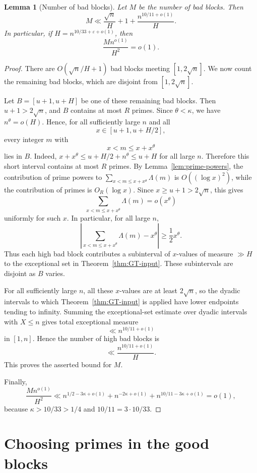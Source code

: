\documentclass[11pt,reqno]{amsart}
\numberwithin{equation}{section}
\theoremstyle{plain}
\newtheorem{lemma}[theorem]{Lemma}
\theoremstyle{definition}
\newcommand{\eps}{\varepsilon}
\begin{document}
\begin{lemma}[Number of bad blocks]
\label{lem:bad-blocks}
Let $M$ be the number of bad blocks.  Then
\[
M \ll \frac{\sqrt n}{H}+1+\frac{n^{10/11+o(1)}}{H}.
\]
In particular, if $H=n^{10/33+\eps+o(1)}$, then
\[
        \frac{M n^{o(1)}}{H^2}=o(1).
\]
\end{lemma}

\begin{proof}
There are $O(\sqrt n/H+1)$ bad blocks meeting $[1,2\sqrt n]$.  We now count the
remaining bad blocks, which are disjoint from $[1,2\sqrt n]$.

Let \(B=[u+1,u+H]\) be one of these remaining bad blocks.  Then
\(u+1>2\sqrt n\), and \(B\) contains at most \(R\) primes.  Since
\(\theta<\kappa\), we have \(n^\theta=o(H)\).  Hence, for all sufficiently
large \(n\) and all
\[
        x\in [u+1,u+H/2],
\]
every integer \(m\) with
\[
        x<m\le x+x^\theta
\]
lies in \(B\).  Indeed, \(x+x^\theta\le u+H/2+n^\theta\le u+H\) for all large
\(n\).  Therefore this short interval contains at most \(R\) primes.  By
Lemma~\ref{lem:prime-powers}, the contribution of prime powers to
\(\sum_{x<m\le x+x^\theta}\Lambda(m)\) is \(O((\log x)^2)\), while the
contribution of primes is \(O_R(\log x)\).  Since \(x\ge u+1>2\sqrt n\), this
gives
\[
        \sum_{x<m\le x+x^\theta}\Lambda(m)=o(x^\theta)
\]
uniformly for such \(x\).  In particular, for all large \(n\),
\[
\left|\sum_{x<m\le x+x^\theta}\Lambda(m)-x^\theta\right|
        \ge \frac12 x^\theta.
\]
Thus each high bad block contributes a subinterval of \(x\)-values of measure
\(\gg H\) to the exceptional set in Theorem~\ref{thm:GT-input}.  These
subintervals are disjoint as \(B\) varies.

For all sufficiently large \(n\), all these \(x\)-values are at least
\(2\sqrt n\), so the dyadic intervals to which Theorem~\ref{thm:GT-input} is
applied have lower endpoints tending to infinity.  Summing the exceptional-set
estimate over dyadic intervals with \(X\le n\) gives total exceptional measure
\[
        \ll n^{10/11+o(1)}
\]
in \([1,n]\).  Hence the number of high bad blocks is
\[
        \ll \frac{n^{10/11+o(1)}}{H}.
\]
This proves the asserted bound for \(M\).

Finally,
\[
        \frac{M n^{o(1)}}{H^2}
        \ll
        n^{1/2-3\kappa+o(1)}
        +n^{-2\kappa+o(1)}
        +n^{10/11-3\kappa+o(1)}
        =o(1),
\]
because $\kappa>10/33>1/4$ and $10/11=3\cdot 10/33$.
\end{proof}

\section{Choosing primes in the good blocks}
\end{document}
